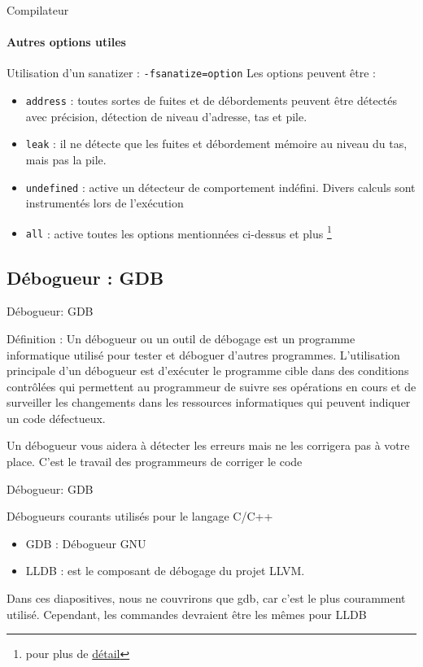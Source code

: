\begin{frame}{Compilateur}
	\framesubtitle{Autres options utiles}
	\begin{block}{Utilisation d'un sanatizer : \texttt{-fsanatize=option}}
		Les options peuvent être :
		\begin{itemize}
			\item \alert{\texttt{address}} : toutes sortes de fuites et de débordements peuvent être détectés avec précision, détection de niveau d'adresse, tas et pile.
			\item \alert{\texttt{leak}} : il ne détecte que les fuites et débordement mémoire au niveau du tas, mais pas la pile.
			\item \alert{\texttt{undefined}} : active un détecteur de comportement indéfini. Divers calculs sont instrumentés lors de l'exécution
			\item \alert{\texttt{all}} : active toutes les options mentionnées ci-dessus et plus \footnote[frame]{pour plus de \href{https://gcc.gnu.org/onlinedocs/gcc-5.3.0/gcc/Debugging-Options.html}{détail}}
		\end{itemize}
	\end{block}
\end{frame}

\subsection{Débogueur : GDB}
\begin{frame}{Débogueur: GDB}
	\begin{block}{Définition : }
		Un débogueur ou un outil de débogage est un programme informatique utilisé pour tester et déboguer d'autres programmes. L'utilisation principale d'un débogueur est d'exécuter le programme cible dans des conditions contrôlées qui permettent au programmeur de suivre ses opérations en cours et de surveiller les changements dans les ressources informatiques qui peuvent indiquer un code défectueux.
	\end{block}
	\begin{alertblock}{Un débogueur vous aidera à détecter les erreurs mais ne les corrigera pas à votre place. C'est le travail des programmeurs de corriger le code}
	\end{alertblock}
\end{frame}

\begin{frame}{Débogueur: GDB}
	\begin{exampleblock}{Débogueurs courants utilisés pour le langage C/C++}
		\begin{itemize}
			\item GDB : Débogueur GNU
			\item LLDB : est le composant de débogage du projet LLVM.
		\end{itemize}
	\end{exampleblock}
	\begin{alertblock}{Dans ces diapositives, nous ne couvrirons que gdb, car c'est le plus couramment utilisé. Cependant, les commandes devraient être les mêmes pour LLDB}
	\end{alertblock}
\end{frame}

